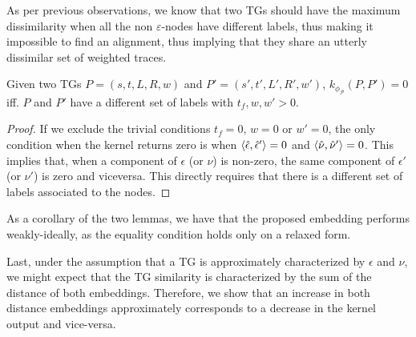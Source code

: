 As per previous observations, we know that two TGs should have the maximum dissimilarity when all the non $\varepsilon$-nodes have different labels, thus making it impossible to find an alignment, thus implying that they share an utterly dissimilar set of weighted traces.

\begin{lemma}
	Given two TGs $P=(s,t,L,R,w)$ and $P'=(s',t',L',R',w')$, $k_{\phi_{\mathcal{P}}}(P,P')=0$ iff. $P$ and $P'$ have a different set of labels with $t_f,w,w'>0$.
\end{lemma}
\begin{proof}
	If we exclude the trivial conditions $t_f=0$, $w=0$ or $w'=0$, the only condition when the kernel returns zero is when  $\Braket{\hat{\epsilon},\hat{\epsilon}'}=0$ and $\Braket{\hat{\nu},\hat{\nu}'}=0$. This implies that, when a component of $\epsilon$ (or $\nu$) is non-zero, the same component of $\epsilon'$ (or $\nu'$) is zero and viceversa. This directly requires that there is a different set of labels associated to the nodes. 
\end{proof}

As a corollary of the two lemmas, we have that the proposed embedding performs weakly-ideally, as the equality condition holds only on a relaxed form.

Last, under the assumption that a TG is approximately characterized by $\epsilon$ and $\nu$, we might expect that the TG similarity is characterized by the sum of the distance of both embeddings. Therefore, we show that an increase in both distance embeddings approximately corresponds to a decrease in the kernel output and vice-versa.

